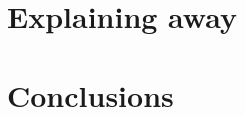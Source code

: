 \documentclass[12pt]{report}
\begin{document}
    \chapter{Explaining away}
    
    
    \chapter{Conclusions}
    

   \appendix
    
    




    
    
\end{document}
